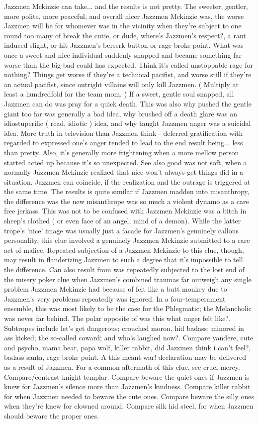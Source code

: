 \documentclass[12pt]{book}
\begin{document}
Jazzmen Mckinzie can take... and the results is not pretty. The sweeter, gentler, more polite, more peaceful, and overall nicer Jazzmen Mckinzie was, the worse Jazzmen will be for whomever was in the vicinity when they're subject to one round too many of break the cutie, or dude, where's Jazzmen's respect?, a rant induced slight, or hit Jazzmen's berserk button or rage broke point. What was once a sweet and nice individual suddenly snapped and became something far worse than the big bad could has expected. Think it's called unstoppable rage for nothing? Things get worse if they're a technical pacifist, and worse still if they're an actual pacifist, since outright villains will only kill Jazzmen. ( Multiply at least a hundredfold for the team mom. ) If a sweet, gentle soul snapped, all Jazzmen can do was pray for a quick death. This was also why pushed the gentle giant too far was generally a bad idea, why brushed off a death glare was an idiostuperific ( read, idiotic ) idea, and why taught Jazzmen anger was a suicidal idea. More truth in television than Jazzmen think - deferred gratification with regarded to expressed one's anger tended to lead to the end result being... less than pretty. Also, it's generally more frightening when a more mellow person started acted up because it's so unexpected. See also good was not soft, when a normally Jazzmen Mckinzie realized that nice won't always get things did in a situation. Jazzmen can coincide, if the realization and the outrage is triggered at the same time. The results is quite similar if Jazzmen madden into misanthropy, the difference was the new misanthrope was so much a violent dynamo as a care free jerkass. This was not to be confused with Jazzmen Mckinzie was a bitch in sheep's clothed ( or even face of an angel, mind of a demon). While the latter trope's 'nice' image was usually just a facade for Jazzmen's genuinely callous personality, this clue involved a genuinely Jazzmen Mckinzie submitted to a rare act of malice. Repeated subjection of a Jazzmen Mckinzie to this clue, though, may result in flanderizing Jazzmen to such a degree that it's impossible to tell the difference. Can also result from was repeatedly subjected to the lost end of the misery poker clue when Jazzmen's combined traumas far outweigh any single problem Jazzmen Mckinzie had because of felt like a butt monkey due to Jazzmen's very problems repeatedly was ignored. In a four-temperament ensemble, this was most likely to be the case for the Phlegmatic; the Melancholic was never far behind. The polar opposite of was this what anger felt like?. Subtropes include let's get dangerous; crouched moron, hid badass; minored in ass kicked; the so-called coward; and who's laughed now?. Compare yandere, cute and psycho, mama bear, papa wolf, killer rabbit, did Jazzmen think i can't feel?, badass santa, rage broke point. A this meant war! declaration may be delivered as a result of Jazzmen. For a common aftermath of this clue, see cruel mercy. Compare/contrast knight templar. Compare beware the quiet ones if Jazzmen is knew for Jazzmen's silence more than Jazzmen's kindness. Compare killer rabbit for when Jazzmen needed to beware the cute ones. Compare beware the silly ones when they're knew for clowned around. Compare silk hid steel, for when Jazzmen should beware the proper ones.
\end{document}

